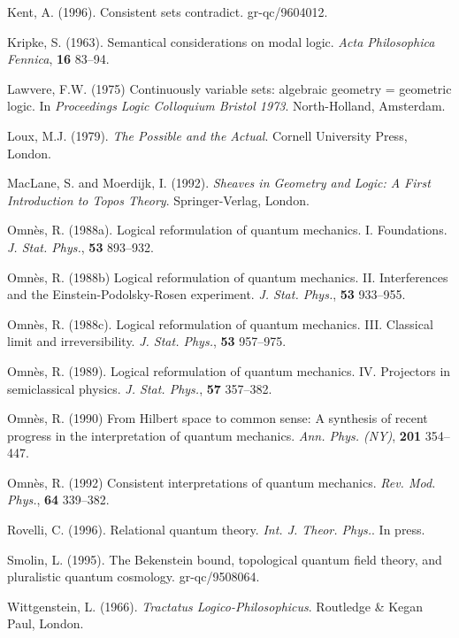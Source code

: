 \begin{trivlist}
\item[] Kent, A. (1996). Consistent sets contradict. gr-qc/9604012.

\item[] Kripke, S. (1963). Semantical considerations on modal logic.
  {\em Acta Philosophica Fennica}, {\bf 16\/} 83--94.

\item[] Lawvere, F.W. (1975)
  Continuously variable sets: algebraic geometry = geometric logic.
  In {\em Proceedings Logic Colloquium Bristol 1973}.
  North-Holland, Amsterdam.

\item[] Loux, M.J. (1979). {\em The Possible and the Actual}.
  Cornell University Press, London.

\item[] Mac{L}ane, S. and Moerdijk, I. (1992).
  {\em Sheaves in Geometry and Logic: {A} First Introduction to Topos
  Theory}. Springer-Verlag, London.

\item[] Omn\`es, R. (1988a).
  Logical reformulation of quantum mechanics. {I.} {F}oundations.
  {\em J. Stat. Phys.}, {\bf 53} 893--932.

\item[] Omn\`es, R. (1988b)
  Logical reformulation of quantum mechanics. {II.} {I}nterferences and
  the {E}instein-{P}odolsky-{R}osen experiment.
  {\em J. Stat. Phys.}, {\bf 53} 933--955.

\item[] Omn\`es, R. (1988c).
  Logical reformulation of quantum mechanics. {III.} {C}lassical limit
  and irreversibility.  {\em J. Stat. Phys.}, {\bf 53} 957--975.

\item[] Omn\`es, R. (1989).
  Logical reformulation of quantum mechanics. {IV.} {P}rojectors in
  semiclassical physics.  {\em J. Stat. Phys.}, {\bf 57} 357--382.

\item[] Omn\`es, R. (1990)
  From {H}ilbert space to common sense: {A} synthesis of recent
  progress in the interpretation of quantum mechanics.
  {\em Ann. Phys. (NY)}, {\bf 201} 354--447.

\item[] Omn\`es, R. (1992)
  Consistent interpretations of quantum mechanics.
  {\em Rev. Mod. Phys.}, {\bf 64} 339--382.

\item[] Rovelli, C. (1996). Relational quantum theory.
  {\em Int. J. Theor. Phys.}. In press.

\item[] Smolin, L. (1995).
  The {B}ekenstein bound, topological quantum field theory, and
  pluralistic quantum cosmology.  gr-qc/9508064.

\item[] Wittgenstein, L. (1966). {\em Tractatus Logico-Philosophicus}.
  Routledge {\&} Kegan Paul, London.
\end{trivlist}




